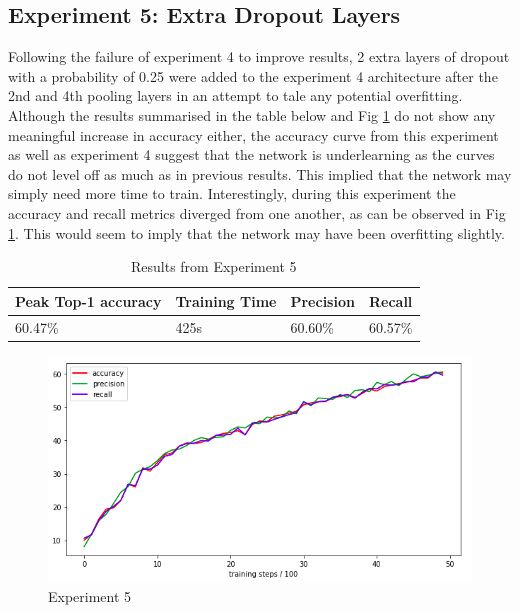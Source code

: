 \documentclass[12pt]{report}
\begin{document}
\newpage
\begin{flushleft}
\vspace{0.5cm}
\section{Experiment 5: Extra Dropout Layers}
Following the failure of experiment 4 to improve results, 2 extra layers of dropout with a probability of 0.25 were added to the experiment 4 architecture after the 2nd and 4th pooling layers in an attempt to tale any potential overfitting. Although the results summarised in the table below and Fig \ref{fig:experiment-5} do not show any meaningful increase in accuracy either, the accuracy curve from this experiment as well as experiment 4 suggest that the network is underlearning as the curves do not level off as much as in previous results. This implied that the network may simply need more time to train. Interestingly, during this experiment the accuracy and recall metrics diverged from one another, as can be observed in Fig \ref{fig:experiment-5}. This would seem to imply that the network may have been overfitting slightly.

\vspace{0.5cm}
\begin{table}[ht!]
\begin{tabular}{llll}
\\ \hline
\multicolumn{1}{|l|}{Peak Top-1 accuracy} & \multicolumn{1}{l|}{Training Time} & \multicolumn{1}{l|}{Precision} & \multicolumn{1}{l|}{Recall}  \\ \hline
\multicolumn{1}{|l|}{60.47\%}             & \multicolumn{1}{l|}{425s}          & \multicolumn{1}{l|}{60.60\%}   & \multicolumn{1}{l|}{60.57\%} \\ \hline
\end{tabular}
\caption{Results from Experiment 5}
\end{table}

\vspace{0.5cm}
\begin{figure}[ht!]
	\centering
	\includegraphics[width=12cm]{experiment-5}
	\caption{Experiment 5}
	\label{fig:experiment-5}
\end{figure}
\end{flushleft}
\end{document}

